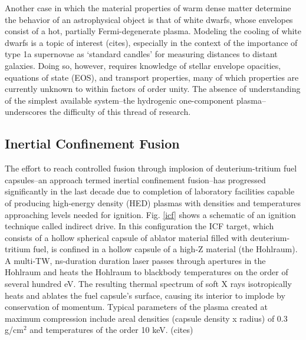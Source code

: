 \documentclass [11pt, proquest, article] {uwthesis}[2016/11/22]
\begin{document}

Another case in which the material properties of warm dense matter determine the behavior of an astrophysical object is that of white dwarfs, whose envelopes consist of a hot, partially Fermi-degenerate plasma. Modeling the cooling of white dwarfs is a topic of interest (cites), especially in the context of the importance of type 1a supernovae as `standard candles' for measuring distances to distant galaxies. Doing so, however, requires knowledge of stellar envelope opacities, equations of state (EOS), and transport properties, many of which properties are currently unknown to within factors of order unity. The absence of understanding of the simplest available system--the hydrogenic one-component plasma--underscores the difficulty of this thread of research.

\subsection{Inertial Confinement Fusion}
The effort to reach controlled fusion through implosion of deuterium-tritium fuel capsules--an approach termed inertial confinement fusion--has progressed significantly in the last decade due to completion of laboratory facilities capable of producing high-energy density (HED) plasmas with densities and temperatures approaching levels needed for ignition. Fig. \ref{icf} shows a schematic of an ignition technique called indirect drive. In this configuration the ICF target, which consists of a hollow spherical capsule of ablator material filled with deuterium-tritium fuel, is confined in a hollow capsule of a high-Z material (the Hohlraum). A multi-TW, ns-duration duration laser passes through apertures in the Hohlraum and heats the Hohlraum to blackbody temperatures on the order of several hundred eV. The resulting thermal spectrum of soft X rays isotropically heats and ablates the fuel capsule's surface, causing its interior to implode by conservation of momentum. Typical parameters of the plasma created at maximum compression include areal densities (capsule density x radius) of 0.3 g/cm$^2$ and temperatures of the order 10 keV. (cites)%
\end{document}
